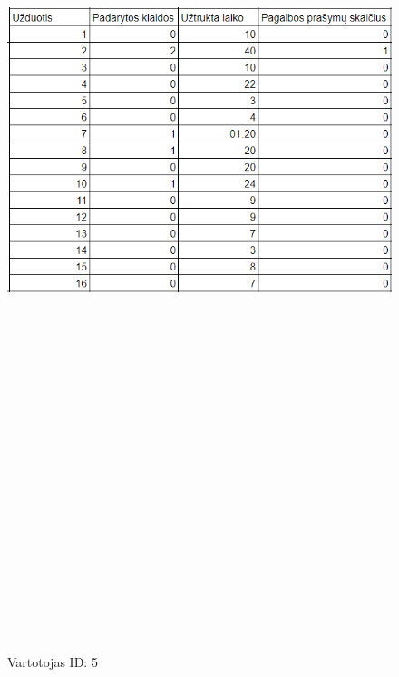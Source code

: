 \documentclass[oneside]{VUMIFPSkursinis}
\begin{document}
	\begin{figure}[h]
			\centering
			\includegraphics[width=15cm,height=60cm,keepaspectratio]{5.png}
			\caption{ Vartotojas ID: 5}
	\end{figure}
\end{document}
